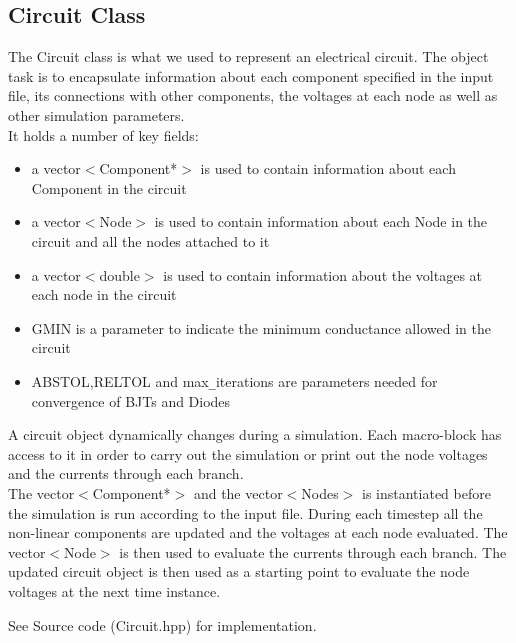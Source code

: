 \documentclass{article}
\begin{document}
\newpage
\subsection{Circuit Class}
The Circuit class is what we used to represent an electrical circuit. The object task is to encapsulate information about each component specified in the input file, its connections with other components, the voltages at each node as well as other simulation parameters.\\
It holds a number of key fields:
\medbreak
\noindent\begin{minipage}{.5\linewidth}
\begin{itemize}
    \item a vector$<$Component*$>$ is used to contain information about each Component in the circuit
    \item a vector$<$Node$>$ is used to contain information about each Node in the circuit and all the nodes attached to it
    \item a vector$<$double$>$ is used to contain information about the voltages at each node in the circuit
\end{itemize}
\end{minipage}%
\begin{minipage}{.5\linewidth}
\begin{itemize}\break
    \item GMIN is a parameter to indicate the minimum conductance allowed in the circuit
    \item ABSTOL,RELTOL and max\verb|_|iterations are parameters needed for convergence of BJTs and Diodes
\end{itemize}
\end{minipage}
\bigbreak
A circuit object dynamically changes during a simulation. Each macro-block has access to it in order to carry out the simulation or print out the node voltages and the currents through each branch.\\
The vector$<$Component*$>$ and the vector$<$Nodes$>$ is instantiated before the simulation is run according to the input file. During each timestep all the non-linear components are updated and the voltages at each node evaluated. The vector$<$Node$>$ is then used to evaluate the currents through each branch. The updated circuit object is then used as a starting point to evaluate the node voltages at the next time instance.

\bigbreak
See Source code (Circuit.hpp) for implementation.

\newpage
\end{document}
